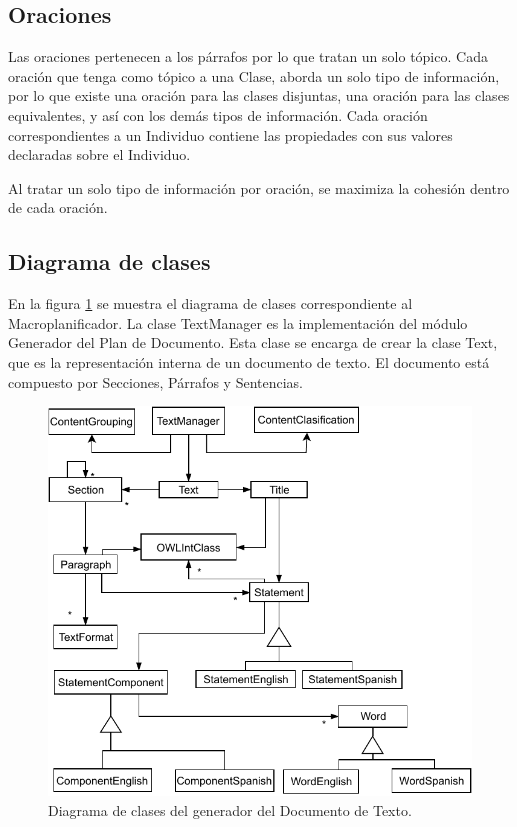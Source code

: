 \subsection{Oraciones}
Las oraciones pertenecen a los párrafos por lo que tratan un solo tópico. Cada oración que tenga como tópico a una Clase,  aborda un solo tipo de información, por lo que existe una oración para las clases disjuntas, una oración para las clases equivalentes, y así con los demás tipos de información. Cada oración correspondientes a un Individuo contiene las propiedades con sus valores declaradas sobre el Individuo.

Al tratar un solo tipo de información por oración, se maximiza la cohesión dentro de cada oración.


\subsection{Diagrama de clases}
En la figura \ref{fig:diagrama_clases_macroplanificador} se muestra el diagrama de clases correspondiente al Macroplanificador. La clase TextManager es la implementación del módulo Generador del Plan de Documento. Esta clase se encarga de crear la clase Text, que es la representación interna de un documento de texto. El documento está compuesto por Secciones, Párrafos y Sentencias. 

\begin{figure}
    \centering
    \includegraphics{img/generacion_documento/diagrama_clases_macroplanificador.pdf}
    \caption{Diagrama de clases del generador del Documento de Texto.}
    \label{fig:diagrama_clases_macroplanificador}
\end{figure}

